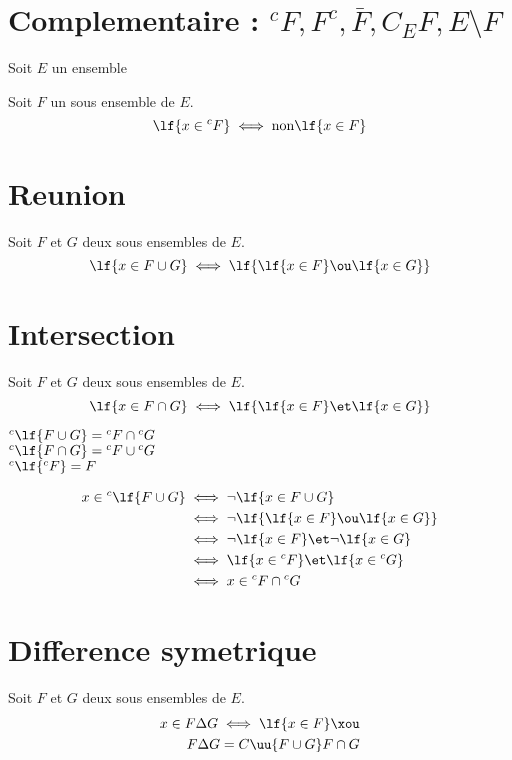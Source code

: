 \documentclass[12pt,twoside,a4paper]{article}
\author{MPSI 2}
\begin{document}
	\maketitle
	\section{Complementaire : ${^cF},F^c,\bar{F},C_EF,E\setminus F$}
		Soit $E$ un ensemble
		\begin{defi}
			Soit $F$ un sous ensemble de $E$.\\
			$$\lf{x\in{^cF}}\iff\text{non}\lf{x\in F}$$
		\end{defi}
	\section{Reunion}
		\begin{defi}
			Soit $F$ et $G$ deux sous ensembles de $E$.
			$$\lf{x\in F\cup G}\iff\lf{\lf{x\in F}\ou\lf{x\in G}}$$
		\end{defi}
	\section{Intersection}
		\begin{defi}
			Soit $F$ et $G$ deux sous ensembles de $E$.
			$$\lf{x\in F\cap G}\iff\lf{\lf{x\in F}\et\lf{x\in G}}$$
		\end{defi}
		\begin{prop}
			${^c\lf{F\cup G}}={^cF}\cap{^cG}$ \\
			${^c\lf{F\cap G}}={^cF}\cup{^cG}$ \\
			${^c\lf{^cF}}=F$
		\end{prop}
		\begin{preuve}
			$$\begin{aligned}
				x\in{^c\lf{F\cup G}}&\iff\neg\lf{x\in F\cup G} \\
									&\iff\neg\lf{\lf{x\in F}\ou\lf{x\in G}} \\
									&\iff\neg\lf{x\in F}\et\neg\lf{x\in G} \\
									&\iff\lf{x\in {^cF}}\et\lf{x\in {^cG}} \\
									&\iff x\in {^cF}\cap{^cG}
			\end{aligned}$$
		\end{preuve}
	\section{Difference symetrique}
		\begin{defi}
			Soit $F$ et $G$ deux sous ensembles de $E$.
			$$\begin{aligned}
				x\in F\Delta G\iff\lf{x\in F}\xou \\
				F\Delta G=C\uu{F\cup G}F\cap G
			\end{aligned}$$
		\end{defi}
\end{document}
